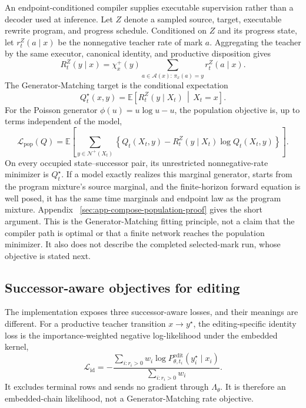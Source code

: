 \documentclass[10pt,letterpaper]{article}
\newcommand{\A}{\mathcal{A}}
\newcommand{\E}{\mathbb{E}}
\begin{document}
An endpoint-conditioned compiler supplies executable supervision rather than a
decoder used at inference. Let $Z$ denote a sampled source, target, executable
rewrite program, and progress schedule. Conditioned on $Z$ and its progress
state, let $r_t^Z(a\mid x)$ be the nonnegative teacher rate of mark $a$.
Aggregating the teacher by the same executor, canonical identity, and
productive disposition gives
\begin{equation}
  R_t^Z(y\mid x)
  =
  \chi_x^+(y)
  \sum_{a\in\A(x):\,\pi_x(a)=y}
  r_t^Z(a\mid x).
  \label{eq:conditional-successor-rate}
\end{equation}
The Generator-Matching target is the conditional expectation
\begin{equation}
  Q_t^\star(x,y)
  =
  \E\!\left[
    R_t^Z(y\mid X_t)
    \,\middle|\,
    X_t=x
  \right].
  \label{eq:marginal-successor-rate}
\end{equation}
For the Poisson generator
$\phi(u)=u\log u-u$, the population objective is, up to terms independent of
the model,
\begin{equation}
  \mathcal L_{\mathrm{pop}}(Q)
  =
  \E\!\left[
    \sum_{y\in\mathcal N^+(X_t)}
    \left\{
      Q_t(X_t,y)
      -
      R_t^Z(y\mid X_t)\log Q_t(X_t,y)
    \right\}
  \right].
  \label{eq:population-successor-gm}
\end{equation}
On every occupied state--successor pair, its unrestricted nonnegative-rate
minimizer is $Q_t^\star$. If a model exactly realizes this marginal generator,
starts from the program mixture's source marginal, and the finite-horizon
forward equation is well posed, it has the same time marginals and endpoint
law as the program mixture. Appendix
~\ref{sec:app-compose-population-proof} gives the short argument. This is the
Generator-Matching fitting principle, not a claim that the compiler path is
optimal or that a finite network reaches the population minimizer. It also
does not describe the completed selected-mark run, whose objective is stated
next.

\subsection{Successor-aware objectives for editing}
\label{sec:successor-objectives}

The implementation exposes three successor-aware losses, and their meanings
are different. For a productive teacher transition $x\rightarrow y^\star$,
the editing-specific identity loss is the importance-weighted negative
log-likelihood under the embedded kernel,
\begin{equation}
  \mathcal L_{\mathrm{id}}
  =
  -
  \frac{
    \sum_{i:r_i>0}w_i
    \log
    P_{\theta,t_i}^{\mathrm{edit}}(y_i^\star\mid x_i)
  }{
    \sum_{i:r_i>0}w_i
  }.
  \label{eq:productive-identity-loss}
\end{equation}
It excludes terminal rows and sends no gradient through
$\Lambda_\theta$. It is therefore an embedded-chain likelihood, not a
Generator-Matching rate objective.
\end{document}
